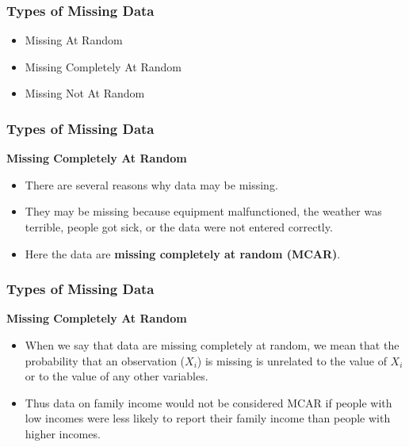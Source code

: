 \documentclass[MASTER.tex]{subfiles}
\begin{document}
 
	\begin{frame}
		\frametitle{Types of Missing Data}
		\Large
\begin{itemize}
	\item Missing At Random
	\item Missing Completely At Random
	\item Missing Not At Random
\end{itemize}
\end{frame}
\begin{frame}
\frametitle{Types of Missing Data}
\Large

\noindent \textbf{Missing Completely At Random}
\begin{itemize}
\item  There are several reasons why data may be missing. \item They may be missing because equipment malfunctioned, the weather was terrible, people got sick, or the data were not entered correctly. 
\item Here the data are \textbf{missing completely at random (MCAR)}.
\end{itemize}
\end{frame}
\begin{frame}
	\frametitle{Types of Missing Data}
	\Large
	
	\noindent \textbf{Missing Completely At Random}
	\begin{itemize}
		\item When we say that data are missing completely at random, we mean that the probability that an observation ($X_i$) is missing is unrelated to the value of $X_i$ or to the value of any other variables.
\item Thus data on family income would not be considered MCAR if people with low incomes were less likely to report their family income than people with higher incomes.
\end{itemize}
\end{frame}
%		
\end{document}
